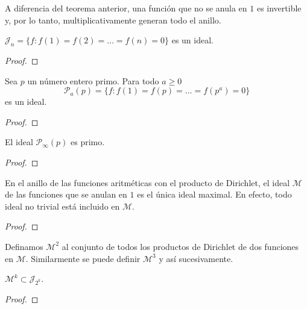 \documentclass[main.tex]{subfiles}
\begin{document}
A diferencia del teorema anterior, una funci\'on que no se anula en $1$ es invertible y, por lo tanto, multiplicativamente generan todo el anillo.
\begin{theorem}
$\mathcal{J}_n = \{f : f(1) = f(2) = \dots = f(n) = 0\}$ es un ideal.
\end{theorem}
\begin{proof}
\end{proof}
\begin{theorem}
Sea $p$ un n\'umero entero primo. Para todo $a \geq 0$
$$\mathcal{P}_a(p) = \{f : f(1) = f(p) = \dots = f(p^a) = 0\}$$
es un ideal.
\end{theorem}
\begin{proof}
\end{proof}
\begin{theorem}
El ideal $\mathcal{P}_{\infty}(p)$ es primo.
\end{theorem}
\begin{proof}
\end{proof}
\begin{theorem}
En el anillo de las funciones aritm\'eticas con el producto de Dirichlet, el ideal $\mathcal{M}$ de las funciones que se anulan en $1$ es el \'unica ideal maximal. En efecto, todo ideal no trivial est\'a incluido en $\mathcal{M}$.
\end{theorem}
\begin{proof}
\end{proof}
Definamos $\mathcal{M}^2$ al conjunto de todos los productos de Dirichlet de dos funciones en $\mathcal{M}$. Similarmente se puede definir $\mathcal{M}^3$ y as\'i sucesivamente.
\begin{theorem}
$\mathcal{M}^k \subset \mathcal{J}_{2^k}$.
\end{theorem}
\begin{proof}
\end{proof}
\end{document}
